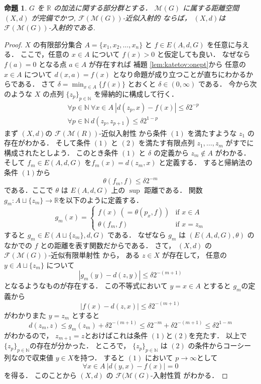 \documentclass[leqno, 12pt]{jsarticle}
\newtheorem{prop}[thm]{命題}
\newcommand{\nn}{\mathbb{N}}
\newcommand{\rr}{\mathbb{R}}
\begin{document}
\begin{prop}\label{prop:katetov:compinj}
$G$
を
$\rr$
の加法に関する部分群とする．
$\mathscr{M}(G)$
に属する距離空間
$(X, d)$
が完備でかつ, 
$\mathscr{F}(\mathscr{M}(G))$-近似入射的
ならば，
$(X, d)$は
$\mathscr{F}(\mathscr{M}(G))$-入射的である.
\end{prop}
\begin{proof}
$X$
の有限部分集合
$A=\{x_1,x_2,\dots, x_n\}$
と
$f\in E(A, d, G)$
を任意に与える．
ここで，任意の
$x\in A$
について
$f(x)>0$
と仮定しても良い．
なぜなら
$f(a)=0$
となる点
$a\in A$
が存在すれば
補題 
\ref{lem:katetov:onept}から
任意の
$x\in A$
について
$d(x, a)=f(x)$
となり命題が成り立つことが直ちにわかるからである．
さて
$\delta=\min_{x\in A}\{f(x)\}$
とおくと
$\delta\in (0, \infty)$
である．
今から次のような
$X$
の点列
$\{z_p\}_{p\in \nn}$
を帰納的に構成して行く．
\begin{align}
&\forall p\in \nn\ \forall x\in A\ |d(z_p,x)-f(x)|\le \delta2^{-p}\\
&\forall p\in \nn\ d(z_p, z_{p+1})\le \delta2^{1-p}
\end{align}
まず
$(X, d)$の
$\mathscr{F}(\mathscr{M}(R))$-近似入射性
から条件
$(1)$
を満たすような
$z_{1}$
の存在がわかる．
そして条件
$(1)$
と
$(2)$
を満たす有限点列
$z_{1},\dots, z_{m}$
がすでに構成されたとしよう．
このとき条件
$(1)$
と
$\delta$
の定義から
$z_{m}\not\in A$
がわかる．
そして
$f_{m}\in E(A, d, G)$
を$f_{m}(x)=d(z_{m}, x)$
と定義する．
すると帰納法の条件
$(1)$から
\[
\theta(f_m, f)\le \delta2^{-m}
\]
である．ここで
$\theta$
は
$E(A, d, G)$
上の
$\sup$
距離である．
関数
$g_{m}\colon A\sqcup \{z_{m}\}\to \rr$を以下のように定義する．
\[
g_{m}(x)=
\begin{cases}
f(x)\  (=\theta(p_x, f)) & \text{if $x\in A$}\\
\theta(f_m, f) & \text{if $x=z_{m}$}
\end{cases}
\]
すると
$g_{m}\in E(A\sqcup\{z_m\}, d, G)$
である．
なぜなら
$g_{m}$
は
$(E(A, d, G), \theta)$
のなかでの
$f$
との距離を表す関数だからである．
さて，
$(X, d)$
の
$\mathscr{F}(\mathscr{M}(G))$-近似有限単射性
から，
ある
$z\in X$
が存在して，
任意の
$y\in A\sqcup\{z_{m}\}$
について
\[
|g_{m}(y)-d(z, y)|\le \delta2^{-(m+1)}
\]
となるようなものが存在する．
この不等式において
$y=x\in A$
とすると
$g_{m}$の定義から
\[
|f(x)-d(z,x)|\le \delta2^{-(m+1)}
\]
がわかりまた
$y=z_{m}$
とすると
\[
d(z_{m}, z)\le g_{m}(z_{m})+\delta2^{-(m+1)}\le \delta2^{-m}+\delta2^{-(m+1)}
\le\delta 2^{1-m}
\]
がわかるので，
$z_{m+1}=z$とおけばこれは条件
$(1)$と$(2)$を充たす．
以上で
$\{z_{p}\}_{p\in\nn}$の存在が分かった．
ところで，
$\{z_{p}\}_{p\in \nn}$
は
$(2)$
の条件からコーシー列なので収束値
$y\in X$を持つ．
すると
$(1)$
において
$p\to \infty$として
\[
\forall x\in A\ |d(y, x)-f(x)|=0
\]
を得る．
このことから
$(X, d)$
の
$\mathscr{F}(\mathscr{M}(G)$-入射性質
がわかる．
\end{proof}
\end{document}
